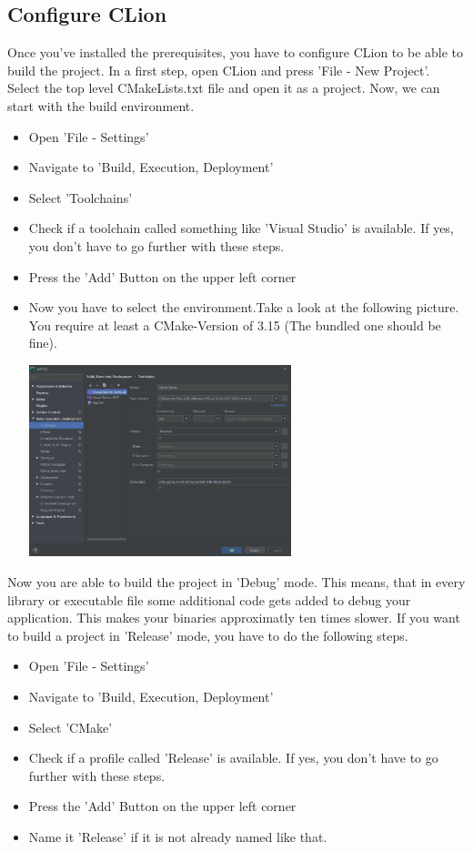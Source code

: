 \subsection{Configure CLion}
Once you've installed the prerequisites, you have to configure CLion to be able to build the project.
In a first step, open CLion and press 'File - New Project'.
Select the top level CMakeLists.txt file and open it as a project.
Now, we can start with the build environment.
\begin{itemize}
    \item Open 'File - Settings'
    \item Navigate to 'Build, Execution, Deployment'
    \item Select 'Toolchains'
    \item Check if a toolchain called something like 'Visual Studio' is available.
    If yes, you don't have to go further with these steps.
    \item Press the 'Add' Button on the upper left corner
    \item Now you have to select the environment.Take a look at the following picture.
    You require at least a CMake-Version of 3.15 (The bundled one should be fine).\par
    \begin{minipage}{\linewidth}
        \centering
        \includegraphics[width=0.6\textwidth]{../common/chapter_01/resources/01_clion_configure_toolchain.png}
    \end{minipage}
\end{itemize}
Now you are able to build the project in 'Debug' mode. This means, that in every library or executable file some additional
code gets added to debug your application. This makes your binaries approximatly ten times slower. If you want to build
a project in 'Release' mode, you have to do the following steps.
\begin{itemize}
    \item Open 'File - Settings'
    \item Navigate to 'Build, Execution, Deployment'
    \item Select 'CMake'
    \item Check if a profile called 'Release' is available. If yes, you don't have to go further with these steps.
    \item Press the 'Add' Button on the upper left corner
    \item Name it 'Release' if it is not already named like that.
\end{itemize}
